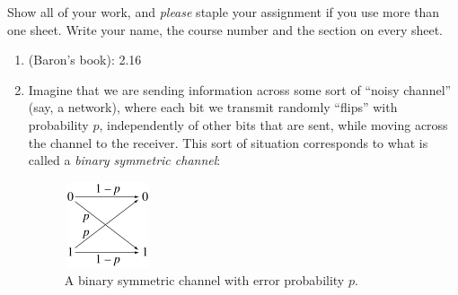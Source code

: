 





\pagestyle{fancy} 
Show all of your work, and \emph{please} staple your assignment if you use more than one sheet. Write your name, the course number and the section on every sheet. 

\begin{enumerate} 
    \item (Baron's book): 2.16
    
    
    
  \item Imagine that we are sending information across some sort of ``noisy channel'' (say, a network), where each bit we transmit randomly ``flips'' with probability $p$, independently of other bits that are sent, while moving across the channel to the receiver. This sort of situation corresponds to what is called a \emph{binary symmetric channel}:
\begin{figure}[h]
\begin{center}
\includegraphics[height = 1in, width = 1in]{Binary_symmetric_channel.png}
\caption{A binary symmetric channel with error probability $p$.}
\end{center}
\end{figure}


\end{enumerate}
